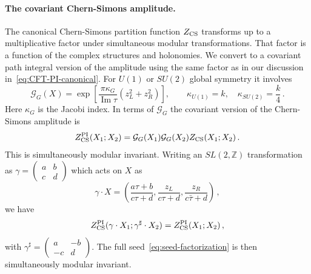 \documentclass[11pt]{article}
\numberwithin{equation}{section}
\begin{document}
\paragraph{The covariant Chern-Simons amplitude.}
The canonical Chern-Simons partition function $Z_{\rm CS}$ transforms up to a multiplicative factor under simultaneous modular transformations. That factor is a function of the complex structures and holonomies. We convert to a covariant path integral version of the amplitude using the same factor as in our discussion in~\eqref{eq:CFT-PI-canonical}. For $U(1)$ or $SU(2)$ global symmetry it involves 
\begin{equation}
\mathcal G_G(X)=\exp\!\left[\frac{\pi\kappa_G}{\operatorname{Im}\tau}
 (z_L^2+z_R^2)\right],\qquad
 \kappa_{U(1)}=k,\quad \kappa_{SU(2)}=\frac{k}{4}\,.
\label{eq:canonical-PI-conversion}
\end{equation}
Here $\kappa_G$ is the Jacobi index. In terms of $\mathcal{G}_G$ the covariant version of the Chern-Simons amplitude is
\begin{equation}
Z_{\rm CS}^{\mathrm{PI}}(X_1;X_2)
 =\mathcal G_G(X_1)\mathcal G_G(X_2)Z_{\rm CS}(X_1;X_2)\,.
\label{eq:CS-PI-kernel}
\end{equation}
This is simultaneously modular invariant. Writing an $SL(2,\mathbb{Z})$ transformation as $\gamma=\left(\begin{smallmatrix}a&b\\c&d\end{smallmatrix}\right)$ which acts on $X$ as
\begin{equation}
\gamma\cdot X
 =\left(\frac{a\tau+b}{c\tau+d},\frac{z_L}{c\tau+d},
 \frac{z_R}{c\bar\tau+d}\right)\,,
\label{eq:paired-source-modular-action}
\end{equation}
we have
\begin{equation}
Z_{\rm CS}^{\mathrm{PI}}(\gamma\cdot X_1;\gamma^\sharp\cdot X_2)
 =Z_{\rm CS}^{\mathrm{PI}}(X_1;X_2)\,,
\label{eq:CS-PI-invariance}
\end{equation}
with $\gamma^\sharp=\left(\begin{smallmatrix}a&-b\\-c&d\end{smallmatrix}\right)$. The full seed~\eqref{eq:seed-factorization} is then simultaneously modular invariant.
\end{document}
